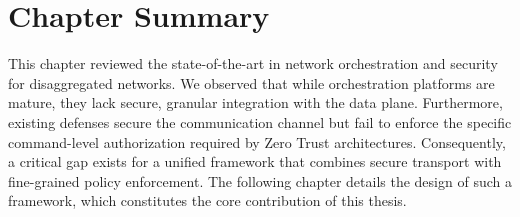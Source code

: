 \documentclass[12pt, a4paper, reqno, oneside]{book}
\begin{document}

    


\section{Chapter Summary}

This chapter reviewed the state-of-the-art in network orchestration and security for disaggregated networks. We observed that while orchestration platforms are mature, they lack secure, granular integration with the data plane. Furthermore, existing defenses secure the communication channel but fail to enforce the specific command-level authorization required by Zero Trust architectures. Consequently, a critical gap exists for a unified framework that combines secure transport with fine-grained policy enforcement. The following chapter details the design of such a framework, which constitutes the core contribution of this thesis.
\end{document}
